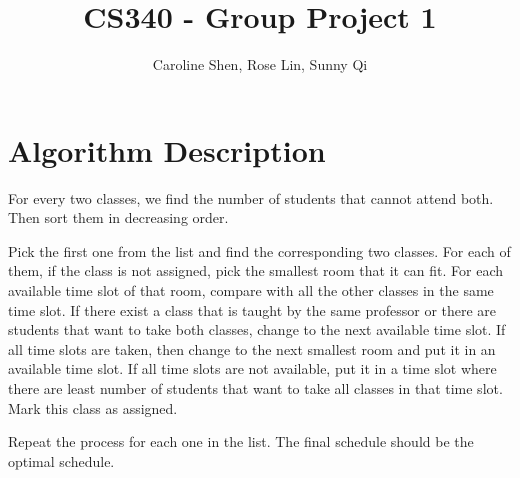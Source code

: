 \documentclass[11pt, oneside]{article}   	%
\title{CS340 - Group Project 1}
\author{Caroline Shen, Rose Lin, Sunny Qi}
\date{}							%
\begin{document}
\maketitle

\section{Algorithm Description}
For every two classes, we find the number of students that cannot attend both. Then sort them in decreasing order. 

Pick the first one from the list and find the corresponding two classes. For each of them, if the class is not assigned, pick the smallest room that it can fit. For each available time slot of that room, compare with all the other classes in the same time slot. If there exist a class that is taught by the same professor or there are students that want to take both classes, change to the next available time slot. If all time slots are taken, then change to the next smallest room and put it in an available time slot. If all time slots are not available, put it in a time slot where there are least number of students that want to take all classes in that time slot. Mark this class as assigned. 

Repeat the process for each one in the list. The final schedule should be the optimal schedule.

\section{}
\begin{algorithm}[H]
\end{algorithm}
\end{document}
